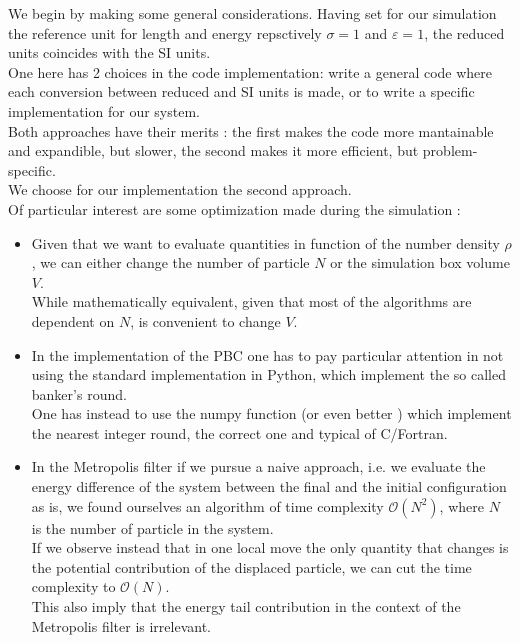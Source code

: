 We begin by making some general considerations. Having set for our simulation the reference unit for length and energy repsctively $\sigma = 1$ and $\varepsilon = 1$, the reduced units coincides with the SI units. \\
One here has 2 choices in the code implementation: write a general code where each conversion between reduced and SI units is made, or to write a specific implementation for our system. \\
Both approaches have their merits : the first makes the code more mantainable and expandible, but slower, the second makes it more efficient, but problem-specific. \\
We choose for our implementation the second approach. \\

Of particular interest are some optimization made during the simulation :
\begin{itemize}
    \item Given that we want to evaluate quantities in function of the number density $\rho$, we can either change the number of particle $N$ or the simulation box volume $V$. \\ 
    While mathematically equivalent, given that most of the algorithms are dependent on $N$, is convenient to change $V$.
    \item In the implementation of the PBC one has to pay particular attention in not using the standard  implementation in Python, which implement the so called banker's round.\\
    One has instead to use the numpy function  (or even better ) which implement the nearest integer round, the correct one and typical of C/Fortran.
    \item In the Metropolis filter if we pursue a naive approach, i.e. we evaluate the energy difference of the system between the final and the initial configuration as is, we found ourselves an algorithm of time 
    complexity $\mathcal{O}(N^2)$, where $N$ is the number of particle in the system. \\
    If we observe instead that in one local move the only quantity that changes is the potential contribution of the displaced particle, we can cut the time complexity to $\mathcal{O}(N)$. \\
    This also imply that the energy tail contribution in the context of the Metropolis filter is irrelevant.
\end{itemize}

